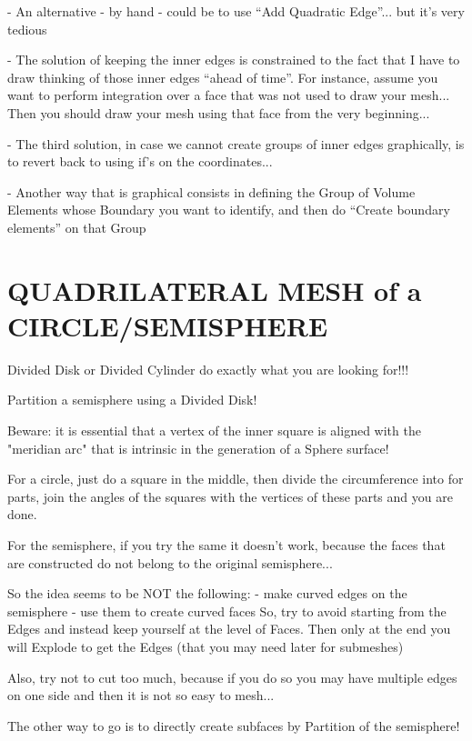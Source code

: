 \documentclass[10pt]{book}
\begin{document}
 
 - An alternative - by hand - could be to use ``Add Quadratic Edge''... but it's very tedious
 
 - The solution of keeping the inner edges is constrained to the fact 
   that I have to draw thinking of those inner edges ``ahead of time''.
   For instance, assume you want to perform integration over a face 
   that was not used to draw your mesh... 
   Then you should draw your mesh using that face from the very beginning...
   
 - The third solution, in case we cannot create groups of inner edges graphically,
    is to revert back to using if's on the coordinates...  
 
 - Another way that is graphical consists in defining the Group of Volume Elements
 whose Boundary you want to identify,
 and then do ``Create boundary elements'' on that Group
 
 
 
\section{QUADRILATERAL MESH of a CIRCLE/SEMISPHERE}


Divided Disk or Divided Cylinder do exactly what you are looking for!!!

Partition a semisphere using a Divided Disk!

Beware: it is essential that a vertex of the inner square is aligned with the "meridian arc" that is intrinsic in the generation of a Sphere surface!

For a circle, just do a square in the middle, then divide the circumference into for parts,
join the angles of the squares with the vertices of these parts and you are done.

For the semisphere, if you try the same it doesn't work, because the faces that are constructed
do not belong to the original semisphere...

So the idea seems to be NOT the following:
 - make curved edges on the semisphere
 - use them to create curved faces
  So, try to avoid starting from the Edges and instead keep yourself at the level of Faces.
  Then only at the end you will Explode to get the Edges (that you may need later for submeshes)
  
  Also, try not to cut too much, because if you do so you may have multiple edges on one side and then it is not so easy to mesh...
 
 The other way to go is to directly create subfaces by Partition of the semisphere!
 
\end{document}
